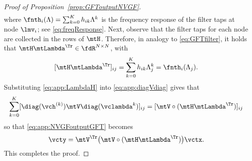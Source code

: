 \begin{proof}[Proof of Proposition~\ref{prop:GFToutputNVGF}]
\begin{equation}
\begin{aligned}
\end{aligned}
%
\end{equation}
%
where $\fnth_{i}(\lambda) = \sum_{k=0}^{K} h_{ik} \lambda^{k}$ is the frequency response of the filter taps at node $\lmv_{i}$; see \eqref{eq:freqResponse}. Next, observe that the filter taps for each node are collected in the rows of $\mtH$. Therefore, in analogy to \eqref{eq:GFTfilter}, it holds that $\mtH \mtLambda^{\Tr} \in \fdR^{N \times N}$, with
\begin{equation} \label{eq:app:LambdaH}
    [\mtH \mtLambda^{\Tr}]_{ij} = \sum_{k=0}^{K} h_{ik} \lambda_{j}^{k} = \fnth_{i} (\lambda_{j}).
\end{equation}
%
Substituting \eqref{eq:app:LambdaH} into \eqref{eq:app:diagVdiag} gives that
\begin{equation}
    \sum_{k=0}^{K} [\diag(\vch^{(k)})\mtV \diag(\vclambda^{k})]_{ij} = [\mtV \circ (\mtH \mtLambda^{\Tr})]_{ij}
\end{equation}
%
so that \eqref{eq:app:NVGFoutputGFT} becomes
\begin{equation}
    \vcty = \mtV^{\Tr} \big( \mtV \circ (\mtH \mtLambda^{\Tr}) \big) \vctx.
\end{equation}
This completes the proof.
\end{proof}


